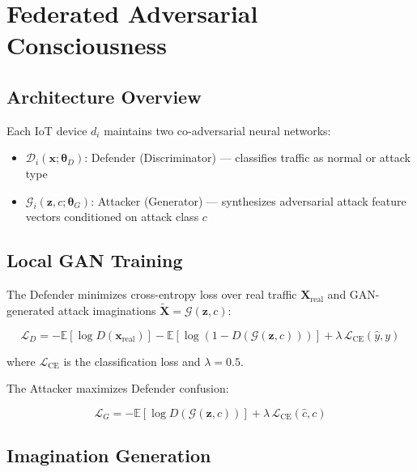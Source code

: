 
\section{Federated Adversarial Consciousness}
\label{sec:fac}

\subsection{Architecture Overview}

Each IoT device $d_i$ maintains two co-adversarial neural networks:

\begin{itemize}
  \item $\mathcal{D}_i(\mathbf{x}; \boldsymbol{\theta}_D)$: Defender (Discriminator)
        — classifies traffic as normal or attack type
  \item $\mathcal{G}_i(\mathbf{z}, c; \boldsymbol{\theta}_G)$: Attacker (Generator)
        — synthesizes adversarial attack feature vectors conditioned on attack class $c$
\end{itemize}

\subsection{Local GAN Training}

The Defender minimizes cross-entropy loss over real traffic
$\mathbf{X}_\text{real}$ and GAN-generated attack imaginations
$\tilde{\mathbf{X}} = \mathcal{G}(\mathbf{z}, c)$:

\begin{equation}
\mathcal{L}_D = -\mathbb{E}\left[\log D(\mathbf{x}_\text{real})\right]
              - \mathbb{E}\left[\log(1 - D(\mathcal{G}(\mathbf{z}, c)))\right]
+ \lambda\,\mathcal{L}_\text{CE}(\hat{y}, y)
\label{eq:defender_loss}
\end{equation}

where $\mathcal{L}_\text{CE}$ is the classification loss and $\lambda = 0.5$.

The Attacker maximizes Defender confusion:

\begin{equation}
\mathcal{L}_G = -\mathbb{E}\left[\log D(\mathcal{G}(\mathbf{z}, c))\right]
              + \lambda\,\mathcal{L}_\text{CE}(\hat{c}, c)
\label{eq:attacker_loss}
\end{equation}

\subsection{Imagination Generation}

